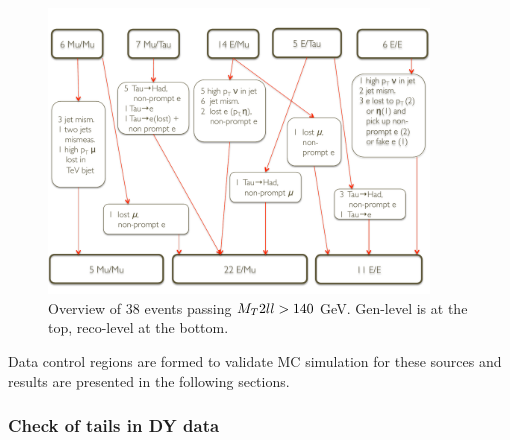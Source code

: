 \begin{figure}[!hbtp]
\centering
\includegraphics[width=0.9\textwidth]{figures/ttBar/ttbar_tail.pdf}
\caption{Overview of 38 events passing $M_{T}2ll>140$ GeV. Gen-level is at the top, reco-level at the bottom.}
\label{fig:ttbar_tail}
\end{figure}

Data control regions are formed to validate MC simulation for these sources and results are presented in the following sections.

\subsubsection{ Check of \ETmiss tails in DY data }

